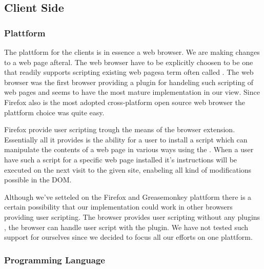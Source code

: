 \subsection{Client Side}

\subsubsection{Plattform}

The plattform for the clients is in essence a web browser. We are making
changes to a web page afteral. The web browser have to be explicitly choosen
to be one that readily supports scripting existing
web pages\dash{}a term often called .
The %
web browser was the first browser providing a
plugin for handeling such scripting of web pages and seems to have the most
mature implementation in our view. Since Firefox also is the
most adopted%
cross-platform open source web browser the plattform choice was quite easy.

Firefox provide user scripting trough the means of the
%
browser extension. Essentially all it provides is the ability for a user to
install a script which can manipulate the contents of a web page
in various ways using the %
\sidenote{
}.
When a user have such a script for a specific web page installed it's
instructions will be executed on the next visit to the given site, enabeling
all kind of modifications possible in the DOM.

Although we've setteled on the Firefox and Greasemonkey plattform there is a
certain possibility that our implementation could work in other browsers
providing user scripting. The  browser provides user scripting
without any plugins%
,
the  browser can handle user script with the
%
plugin. We have not tested such support for ourselves since we decided to
focus all our efforts on one plattform.

\subsubsection{Programming Language}

